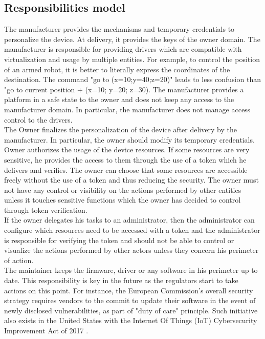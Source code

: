 \documentclass[conference]{IEEEtran}
\begin{document}
\subsection{Responsibilities model}
\label{sec:Resp_model}
The manufacturer provides the mechanisms and temporary credentials to personalize the device. At delivery, it provides the keys of the owner domain. The manufacturer is responsible for providing drivers which are compatible with virtualization and usage by multiple entities. For example, to control the position of an armed robot, it is better to literally express the coordinates of the destination. The command "go to (x=10;y=40;z=20)" leads to less confusion than "go to current position + (x=10; y=20; z=30). The manufacturer provides a platform in a safe state to the owner and does not keep any access to the manufacturer domain. In particular, the manufacturer does not manage access control to the drivers.\\

The Owner finalizes the personalization of the device after delivery by the manufacturer. In particular, the owner should modify its temporary credentials. Owner authorizes the usage of the device resources. If some resources are very sensitive, he provides the access to them through the use of a token which he delivers and verifies. The owner can choose that some resources are accessible freely without the use of a token and thus reducing the security. The owner must not have any control or visibility on the actions performed by other entities unless it touches sensitive functions which the owner has decided to control through token verification.\\

If the owner delegates his tasks to an administrator, then the administrator can configure which resources need to be accessed with a token and the administrator is responsible for verifying the token and should not be able to control or visualize the actions performed by other actors unless they concern his perimeter of action.\\

The maintainer keeps the firmware, driver or any software in his perimeter up to date. This responsibility is key in the future as the regulators start to take actions on this point. For instance, the European Commission's overall security strategy \cite{enisa_iot_2017} requires vendors to the commit to update their software in the event of newly disclosed vulnerabilities, as part of "duty of care" principle. Such initiative also exists in the United States with the Internet Of Things (IoT) Cybersecurity Improvement Act of 2017 \cite{IOTAct_2017}.\\
\end{document}
